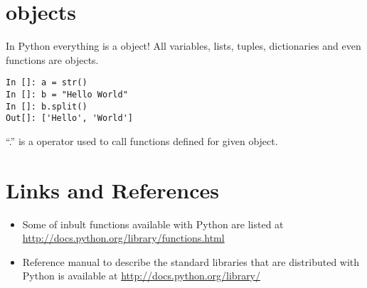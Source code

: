 \documentclass[12pt]{article}
\begin{document}
\section{objects}
In Python everything is a object! All variables, lists, tuples, dictionaries and even functions are objects. 
\begin{lstlisting}
In []: a = str() 
In []: b = "Hello World"
In []: b.split()
Out[]: ['Hello', 'World']
\end{lstlisting}
``.'' is a operator used to call functions defined for given object.
\section{Links and References}
\begin{itemize}
\item Some of inbult functions available with Python are listed at\\ \url{http://docs.python.org/library/functions.html}
\item Reference manual to describe the standard libraries  that are distributed with Python is available at \url{http://docs.python.org/library/} 
\end{itemize}
\end{document}
